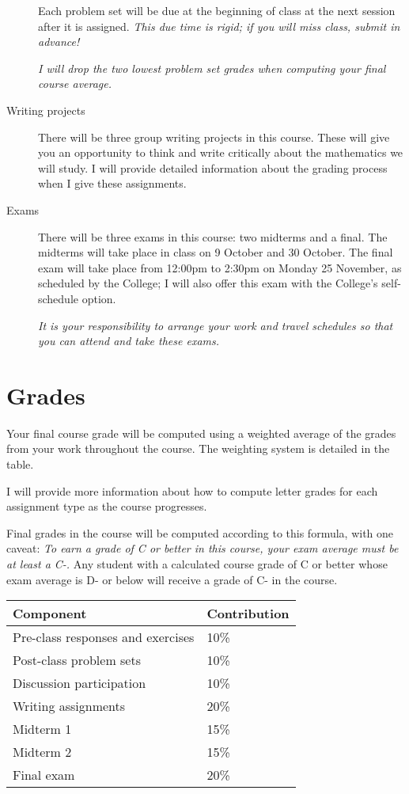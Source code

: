 \documentclass[11pt,article]{memoir}
\begin{document}
\begin{description}
  Each problem set will be due at the beginning of class at the next session after it is assigned.
  \emph{This due time is rigid; if you will miss class, submit in advance!}

  \emph{I will drop the two lowest problem set grades when computing your final course average.}
  
\item[Writing projects]
  There will be three group writing projects in this course.
  These will give you an opportunity to think and write critically about the mathematics we will study.
  I will provide detailed information about the grading process when I give these assignments.

\item[Exams]
  There will be three exams in this course: two midterms and a final.
  The midterms will take place in class on 9 October and 30 October.
  The final exam will take place from 12:00pm to 2:30pm on Monday 25 November, as scheduled by the College; I will also offer this exam with the College's self-schedule option.

  \emph{It is your responsibility to arrange your work and travel schedules so that you can attend and take these exams.}
\end{description}

\section*{Grades}
Your final course grade will be computed using a weighted average of the grades from your work throughout the course.
The weighting system is detailed in the table.

I will provide more information about how to compute letter grades for each assignment type as the course progresses.

Final grades in the course will be computed according to this formula, with one caveat:
\emph{To earn a grade of C or better in this course, your exam average must be at least a C-.}
Any student with a calculated course grade of C or better whose exam average is D- or below will receive a grade of C- in the course.

\begin{table}[h]
  \centering
  \begin{tabular}{l l}
    \toprule
    Component & Contribution \\
    \midrule
    Pre-class responses and exercises & 10\% \\
    Post-class problem sets & 10\% \\
    Discussion participation & 10\% \\
    Writing assignments & 20\% \\
    Midterm 1 & 15\% \\
    Midterm 2 & 15\% \\
    Final exam & 20\% \\
    \bottomrule
  \end{tabular}
\end{table}
\end{document}
